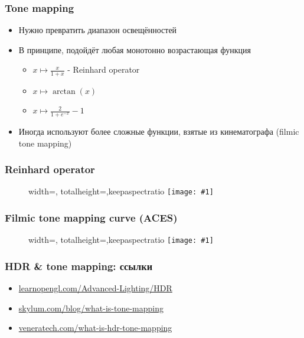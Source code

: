 \documentclass{beamer}
\newcommand{\slideimage}[1]{
  \begin{figure}
    \begin{adjustbox}{width=\textwidth, totalheight=\textheight-2\baselineskip-2\baselineskip,keepaspectratio}
      \texttt{[image: \#1]}
    \end{adjustbox}
  \end{figure}
}
\begin{document}
\begin{frame}[fragile]
\frametitle{Tone mapping}
\begin{itemize}
\item Нужно превратить диапазон освещённостей \begin{math}[0, \infty)\end{math} в диапазон \begin{math}[0, 1]\end{math}
\pause
\item В принципе, подойдёт любая монотонно возрастающая функция \begin{math}[0, \infty)\rightarrow [0, 1]\end{math}
\begin{itemize}
\item \begin{math}x \mapsto \frac{x}{1+x}\end{math} - Reinhard operator
\item \begin{math}x \mapsto \arctan(x)\end{math}
\item \begin{math}x \mapsto \frac{2}{1+e^{-x}}-1\end{math}
\end{itemize}
\pause
\item Иногда используют более сложные функции, взятые из кинематографа (filmic tone mapping)
\end{itemize}
\end{frame}

\begin{frame}[fragile]
\frametitle{Reinhard operator}
\slideimage{reinhard.png}
\end{frame}

\begin{frame}[fragile]
\frametitle{Filmic tone mapping curve (ACES)}
\slideimage{aces.png}
\end{frame}

\begin{frame}[fragile]
\frametitle{HDR \& tone mapping: ссылки}
\begin{itemize}
\item \href{https://learnopengl.com/Advanced-Lighting/HDR}{learnopengl.com/Advanced-Lighting/HDR}
\item \href{https://skylum.com/blog/what-is-tone-mapping}{skylum.com/blog/what-is-tone-mapping}
\item \href{https://www.veneratech.com/what-is-hdr-tone-mapping}{veneratech.com/what-is-hdr-tone-mapping}
\end{itemize}
\end{frame}
\end{document}
